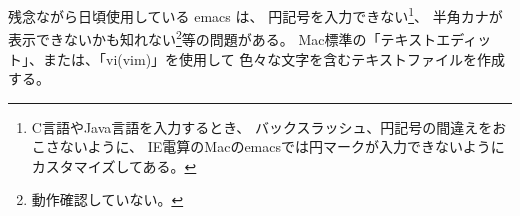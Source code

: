 \documentclass[uplatex,a4j,dvipdfmx]{ujarticle}
\begin{document}
\begin{enumerate}
\begin{enumerate}
残念ながら日頃使用している emacs は、
円記号を入力できない\footnote{
C言語やJava言語を入力するとき、
バックスラッシュ、円記号の間違えをおこさないように、
IE電算のMacのemacsでは円マークが入力できないようにカスタマイズしてある。
}、
半角カナが表示できないかも知れない\footnote{
動作確認していない。
}等の問題がある。
Mac標準の「テキストエディット」、または、「vi(vim)」を使用して
色々な文字を含むテキストファイルを作成する。



\end{enumerate}

%

\end{enumerate}
\end{document}
